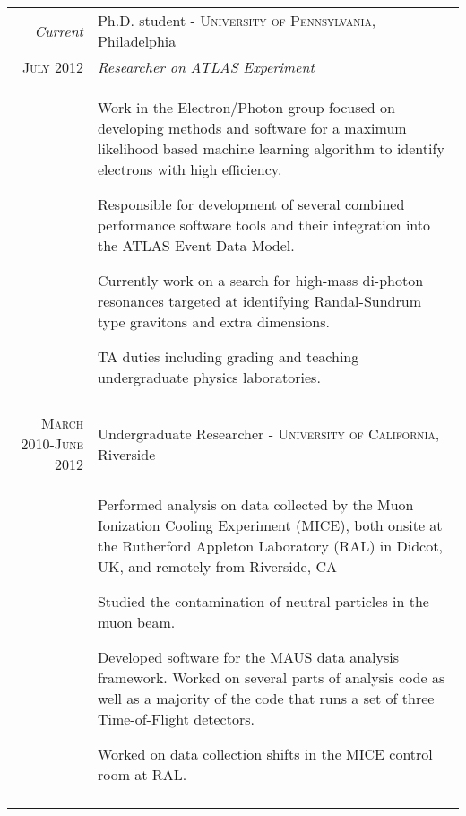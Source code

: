 \documentclass[a4paper,10pt]{article} %
\begin{document}
\begin{longtable}{r|p{11cm}}
\emph{Current}    & Ph.D. student - \textsc{University of Pennsylvania}, Philadelphia \\
\textsc{July 2012} & \emph{Researcher on ATLAS Experiment}\\
				   & \begin{itemize}
					 \footnotesize{
						\item Work in the Electron/Photon group focused on developing methods and software for a maximum likelihood based machine learning algorithm to identify electrons with high efficiency.
						\item Responsible for development of several combined performance software tools and their integration into the ATLAS Event Data Model.
						\item Currently work on a search for high-mass di-photon resonances targeted at identifying Randal-Sundrum type gravitons and extra dimensions.
						\item TA duties including grading and teaching undergraduate physics laboratories.
					 }
					 \end{itemize} \\
\multicolumn{2}{c}{} \\


\textsc{March 2010-June 2012} & Undergraduate Researcher - \textsc{University of California}, Riverside \emph{}\\
				  & \begin{itemize}
					\footnotesize{
						\item Performed analysis on data collected by the Muon Ionization Cooling Experiment (MICE), both onsite at the Rutherford Appleton Laboratory (RAL) in Didcot, UK, and remotely from Riverside, CA
						\item Studied the contamination of neutral particles in the muon beam.
					    \item Developed software for the MAUS data analysis framework.  Worked on several parts of analysis code as well as a majority of the code that runs a set of three Time-of-Flight detectors.
						\item Worked on data collection shifts in the MICE control room at RAL.
					}
			        \end{itemize} \\
\multicolumn{2}{c}{} \\


\end{longtable}
\end{document}
